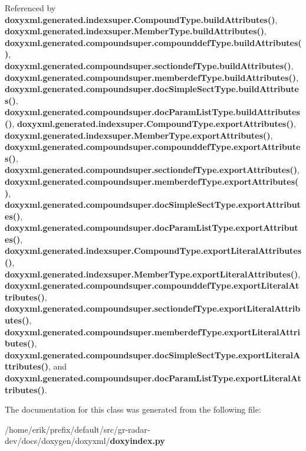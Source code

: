 Referenced by {\bf doxyxml.\+generated.\+indexsuper.\+Compound\+Type.\+build\+Attributes()}, {\bf doxyxml.\+generated.\+indexsuper.\+Member\+Type.\+build\+Attributes()}, {\bf doxyxml.\+generated.\+compoundsuper.\+compounddef\+Type.\+build\+Attributes()}, {\bf doxyxml.\+generated.\+compoundsuper.\+sectiondef\+Type.\+build\+Attributes()}, {\bf doxyxml.\+generated.\+compoundsuper.\+memberdef\+Type.\+build\+Attributes()}, {\bf doxyxml.\+generated.\+compoundsuper.\+doc\+Simple\+Sect\+Type.\+build\+Attributes()}, {\bf doxyxml.\+generated.\+compoundsuper.\+doc\+Param\+List\+Type.\+build\+Attributes()}, {\bf doxyxml.\+generated.\+indexsuper.\+Compound\+Type.\+export\+Attributes()}, {\bf doxyxml.\+generated.\+indexsuper.\+Member\+Type.\+export\+Attributes()}, {\bf doxyxml.\+generated.\+compoundsuper.\+compounddef\+Type.\+export\+Attributes()}, {\bf doxyxml.\+generated.\+compoundsuper.\+sectiondef\+Type.\+export\+Attributes()}, {\bf doxyxml.\+generated.\+compoundsuper.\+memberdef\+Type.\+export\+Attributes()}, {\bf doxyxml.\+generated.\+compoundsuper.\+doc\+Simple\+Sect\+Type.\+export\+Attributes()}, {\bf doxyxml.\+generated.\+compoundsuper.\+doc\+Param\+List\+Type.\+export\+Attributes()}, {\bf doxyxml.\+generated.\+indexsuper.\+Compound\+Type.\+export\+Literal\+Attributes()}, {\bf doxyxml.\+generated.\+indexsuper.\+Member\+Type.\+export\+Literal\+Attributes()}, {\bf doxyxml.\+generated.\+compoundsuper.\+compounddef\+Type.\+export\+Literal\+Attributes()}, {\bf doxyxml.\+generated.\+compoundsuper.\+sectiondef\+Type.\+export\+Literal\+Attributes()}, {\bf doxyxml.\+generated.\+compoundsuper.\+memberdef\+Type.\+export\+Literal\+Attributes()}, {\bf doxyxml.\+generated.\+compoundsuper.\+doc\+Simple\+Sect\+Type.\+export\+Literal\+Attributes()}, and {\bf doxyxml.\+generated.\+compoundsuper.\+doc\+Param\+List\+Type.\+export\+Literal\+Attributes()}.



The documentation for this class was generated from the following file\+:\begin{DoxyCompactItemize}
\item 
/home/erik/prefix/default/src/gr-\/radar-\/dev/docs/doxygen/doxyxml/{\bf doxyindex.\+py}\end{DoxyCompactItemize}

